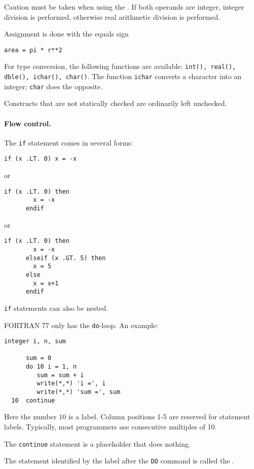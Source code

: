 Caution must be taken when using the . If both operands are integer, integer division is performed, otherwise real arithmetic division is performed.

Assignment is done with the equals sign
\begin{lstlisting}[language={[77]fortran}, style=snippet]
      area = pi * r**2
\end{lstlisting}

For type conversion, the following functions are available: \texttt{int(), real(), dble(), ichar(), char()}. The function \texttt{ichar} converts a character into an integer; \texttt{char} does the opposite.

Constructs that are not statically checked are ordinarily left unchecked.

\paragraph{Flow control.}
The \texttt{if} statement comes in several forms:
\begin{lstlisting}[language={[77]fortran}, style=snippet]
      if (x .LT. 0) x = -x
\end{lstlisting}
or
\begin{lstlisting}[language={[77]fortran}, style=snippet]
      if (x .LT. 0) then
        x = -x
      endif
\end{lstlisting}
or
\begin{lstlisting}[language={[77]fortran}, style=snippet]
      if (x .LT. 0) then
        x = -x
      elseif (x .GT. 5) then
        x = 5
      else
        x = x+1
      endif
\end{lstlisting}
\texttt{if} statements can also be nested.

FORTRAN 77 only has the \texttt{do}-loop. An example:
\begin{lstlisting}[language={[77]fortran}, style=snippet]
      integer i, n, sum
 
      sum = 0
      do 10 i = 1, n
         sum = sum + i
         write(*,*) 'i =', i
         write(*,*) 'sum =', sum
  10  continue
\end{lstlisting}
Here the number $10$ is a label. Column positions 1-5 are reserved for statement labels. Typically, most programmers use consecutive multiples of 10.

The \texttt{continue} statement is a placeholder that does nothing.

The statement identified by the label after the \texttt{DO} command is called the .

